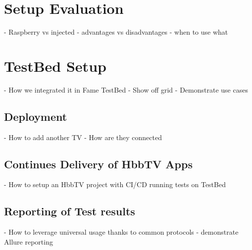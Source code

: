 \section{Setup Evaluation\label{sec:setupevaluation}}

- Raspberry vs injected
- advantages vs disadvantages
- when to use what

\section{TestBed Setup\label{sec:testbed}}

- How we integrated it in Fame TestBed
- Show off grid
- Demonstrate use cases

\subsection{Deployment\label{sec:deployment}}

- How to add another TV
- How are they connected

\subsection{Continues Delivery of HbbTV Apps\label{sec:cicdhbbtvapps}}

- How to setup an HbbTV project with CI/CD running tests on TestBed

\subsection{Reporting of Test results\label{sec:reporting}}

- How to leverage universal usage thanks to common protocols
- demonstrate Allure reporting
